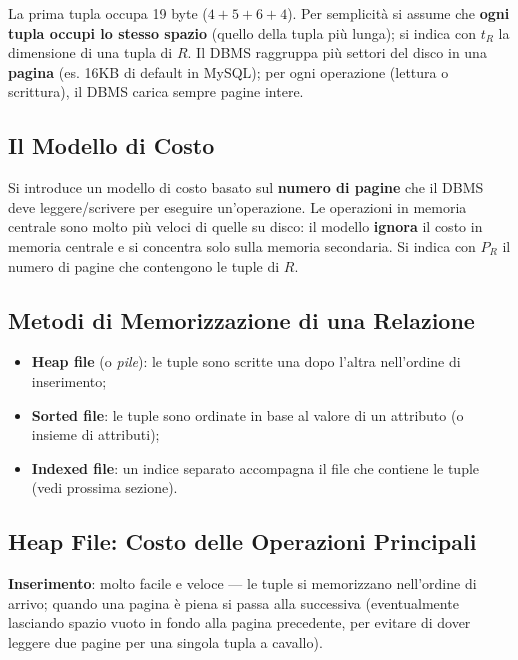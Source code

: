 \documentclass[12pt, a4paper]{article}
\begin{document}
La prima tupla occupa 19 byte ($4+5+6+4$). Per semplicità si assume che \textbf{ogni tupla occupi lo stesso spazio} (quello della tupla più lunga); si indica con $t_R$ la dimensione di una tupla di $R$. Il DBMS raggruppa più settori del disco in una \textbf{pagina} (es. 16KB di default in MySQL); per ogni operazione (lettura o scrittura), il DBMS carica sempre pagine intere.

\subsection{Il Modello di Costo}

Si introduce un modello di costo basato sul \textbf{numero di pagine} che il DBMS deve leggere/scrivere per eseguire un'operazione. Le operazioni in memoria centrale sono molto più veloci di quelle su disco: il modello \textbf{ignora} il costo in memoria centrale e si concentra solo sulla memoria secondaria. Si indica con $P_R$ il numero di pagine che contengono le tuple di $R$.

\subsection{Metodi di Memorizzazione di una Relazione}
\begin{itemize}
    \item \textbf{Heap file} (o \textit{pile}): le tuple sono scritte una dopo l'altra nell'ordine di inserimento;
    \item \textbf{Sorted file}: le tuple sono ordinate in base al valore di un attributo (o insieme di attributi);
    \item \textbf{Indexed file}: un indice separato accompagna il file che contiene le tuple (vedi prossima sezione).
\end{itemize}

\subsection{Heap File: Costo delle Operazioni Principali}

\textbf{Inserimento}: molto facile e veloce — le tuple si memorizzano nell'ordine di arrivo; quando una pagina è piena si passa alla successiva (eventualmente lasciando spazio vuoto in fondo alla pagina precedente, per evitare di dover leggere due pagine per una singola tupla a cavallo).
\end{document}
